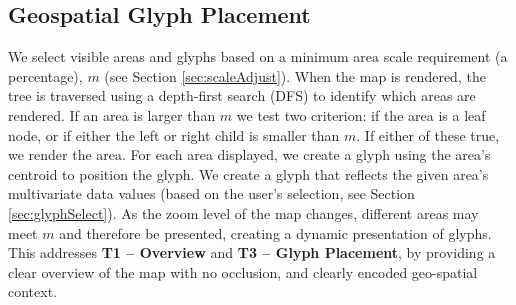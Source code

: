 \subsection{Geospatial Glyph Placement} \label{sec:rendering}
We select visible areas and glyphs based on a minimum area scale requirement (a percentage), $m$ (see Section \ref{sec:scaleAdjust}). When the map is rendered, the tree is traversed using a depth-first search (DFS) to identify which areas are rendered. If an area is larger than $m$ we test two criterion: if the area is a leaf node, or if either the left or right child is smaller than $m$. If either of these true, we render the area. For each area displayed, we create a glyph using the area's centroid to position the glyph. We create a glyph that reflects the given area's multivariate data values (based on the user's selection, see Section \ref{sec:glyphSelect}). As the zoom level of the map changes, different areas may meet $m$ and therefore be presented, creating a dynamic presentation of glyphs. This addresses \textbf{T1 -- Overview} and \textbf{T3 -- Glyph Placement}, by providing a clear overview of the map with no occlusion, and clearly encoded geo-spatial context.

